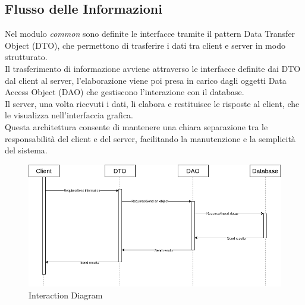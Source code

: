 \subsection{Flusso delle Informazioni}
Nel modulo \textit{common} sono definite le interfacce tramite il 
pattern Data Transfer Object (DTO), che permettono di trasferire
i dati tra client e server in modo strutturato.\\
Il trasferimento di informazione avviene attraverso le interfacce 
definite dai DTO dal client al server, l'elaborazione viene poi presa 
in carico dagli oggetti Data Access Object (DAO) che
gestiscono l'interazione con il database.\\
Il server, una volta ricevuti i dati, li elabora e restituisce
le risposte al client, che le visualizza nell'interfaccia grafica.\\
Questa architettura consente di mantenere una chiara separazione
tra le responsabilità del client e del server, facilitando la
manutenzione e la semplicità del sistema.

\begin{figure}[H]
  \centering
  \includegraphics[width=\textwidth]{images/UML-interaction.png}
  \caption{Interaction Diagram}
  \label{fig:interaction-diagram}
\end{figure}
